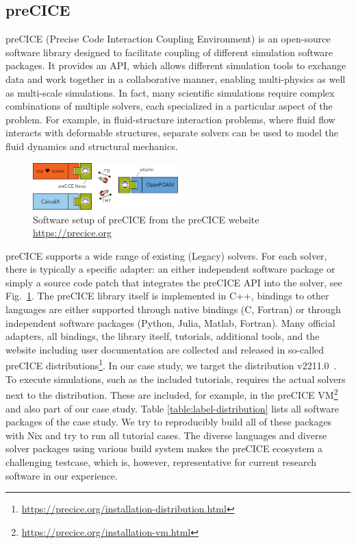 \documentclass{eceasst}
\begin{document}
\subsection{preCICE}

preCICE (Precise Code Interaction Coupling Environment) is an open-source software library designed to facilitate coupling of different simulation software packages.
It provides an API, which allows different simulation tools to exchange data and work together in a collaborative manner, enabling multi-physics as well as multi-scale simulations.
In fact, many scientific simulations require complex combinations of multiple solvers, each specialized in a particular aspect of the problem.
For example, in fluid-structure interaction problems, where fluid flow interacts with deformable structures, separate solvers can be used to model the fluid dynamics and structural mechanics.

\begin{figure}
    \centering
    \includegraphics[width=0.5\textwidth]{figures/precice.png}
    \caption{Software setup of preCICE from the preCICE website \url{https://precice.org}}
    \label{fig:precice}
\end{figure}

preCICE supports a wide range of existing (Legacy) solvers. For each solver, there is typically a specific adapter: an either independent software package or simply a source code patch that integrates the preCICE API into the solver, see Fig.~\ref{fig:precice}.
The preCICE library itself is implemented in C++, bindings to other languages are either supported through native bindings (C, Fortran) or through independent software packages (Python, Julia, Matlab, Fortran).
Many official adapters, all bindings, the library itself, tutorials, additional tools, and the website including user documentation are collected and released in so-called preCICE distributions\footnote{\url{https://precice.org/installation-distribution.html}}.
In our case study, we target the distribution v2211.0~\cite{preciceDistribution}. To execute simulations, such as the included tutorials, requires the actual solvers next to the distribution. These are included, for example, in the preCICE VM\footnote{\url{https://precice.org/installation-vm.html}} and also part of our case study. Table \ref{table:label-distribution} lists all software packages of the case study. We try to reproducibly build all of these packages with Nix and try to run all tutorial cases.
The diverse languages and diverse solver packages using various build system makes the preCICE ecosystem a challenging testcase, which is, however, representative for current research software in our experience.
\end{document}
